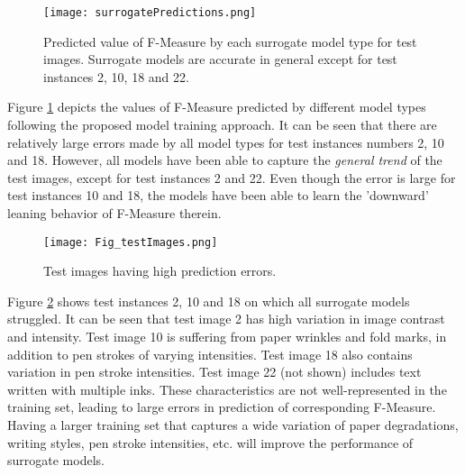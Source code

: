 \documentclass[10pt, a4paper, conference, compsocconf]{IEEEtran}
\begin{document}

\begin{figure}[!t]
\centering
\texttt{[image: surrogatePredictions.png]}
\caption{Predicted value of F-Measure by each surrogate model type for test images. Surrogate models are accurate in general except for test instances 2, 10, 18 and 22.}
\label{fig_surrPred}
\end{figure}


Figure \ref{fig_surrPred} depicts the values of F-Measure predicted by different model types following the proposed model training approach. It can be seen that there are relatively large errors made by all model types for test instances numbers 2, 10 and 18. However, all models have been able to capture the \emph{general trend} of the test images, except for test instances 2 and 22. Even though the error is large for test instances 10 and 18, the models have been able to learn the 'downward' leaning behavior of F-Measure therein. %

\begin{figure}[!t]
\centering
\texttt{[image: Fig\_testImages.png]}
\caption{Test images having high prediction errors.}
\label{fig_testImages}
\end{figure}

Figure \ref{fig_testImages} shows test instances 2, 10 and 18 on which all surrogate models struggled. It can be seen that test image 2 has high variation in image contrast and intensity. Test image 10 is suffering from paper wrinkles and fold marks, in addition to pen strokes of varying intensities. Test image 18 also contains variation in pen stroke intensities. Test image 22 (not shown) includes text written with multiple inks. These characteristics are not well-represented in the training set, leading to large errors in prediction of corresponding F-Measure. Having a larger training set that captures a wide variation of paper degradations, writing styles, pen stroke intensities, etc. will improve the performance of surrogate models.
\end{document}
